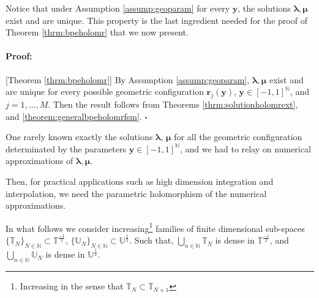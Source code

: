 \documentclass{article}
\newenvironment{proof}{\paragraph{Proof:}}{\hfill$\square$}
\newcommand{\bmu} {\bm{\mu}}
\newcommand{\IN}{{\mathbb N}}
\newcommand{\IR}{{\mathbb R}}
\newcommand{\IU}{{\mathbb U}}
\newcommand{\IT}{{\mathbb T}}
\newcommand{\IW}{{\mathbb W}}
\newcommand{\IY}{{\mathbb Y}}
\newcommand{\bla}{\boldsymbol \lambda}
\newcommand{\br}{\bm{r}}
\newcommand{\by}{\bm{y}}
\begin{document}
Notice that under Assumption \ref{assump:geoparam} for every $\by$, the solutions $\bla,\bmu$ exist and are unique. This property is the last ingredient needed for the proof of Theorem \ref{thrm:bpeholomr} that we now present. 
\begin{proof}[Theorem \ref{thrm:bpeholomr}]
By Assumption \ref{assump:geoparam}, $\bla,\bmu$ exist and are unique for every possible geometric configuration $\br_j(\by)$, $\by \in [-1,1]^\IN$, and $j = 1,\hdots,M$.  Then the result follows from Theorems \ref{thrm:solutionholomrext}, and \ref{theorem:generalbpeholomrfsm}.
\end{proof}

One rarely known exactly the solutions $\bla$, $\bmu$ for all the geometric configuration determinated by the parameters $\by \in [-1,1]^\IN$, and we had to relay on numerical approximations of $\bla,\bmu$.

Then, for practical applications such as high dimension integration and interpolation, we need the parametric holomorphism of the numerical approximations. 


In what follows we consider increasing\footnote{Increasing in the sense that $\IT_N \subset \IT_{N+1}$} families of finite dimensional sub-spaces $\{\IT_N\}_{N \in \IN} \subset \IT^{\frac{-1}{2}}$,  $\{\IU_N\}_{N \in \IN} \subset \IU^{\frac{1}{2}}$. Such that, $\bigcup_{n \in \IN} \IT_N $ is dense in $\IT^{\frac{-1}{2}}$, and  $\bigcup_{n \in \IN} \IU_N$ is dense in $\IU^\frac{1}{2}$. 
\end{document}
